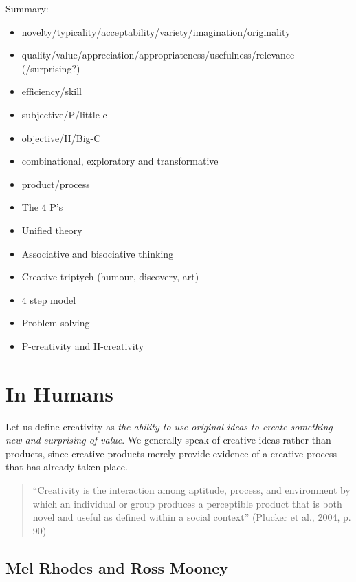 \begin{shaded}
  Summary:
  \begin{itemize}
    \item novelty/typicality/acceptability/variety/imagination/originality
    \item quality/value/appreciation/appropriateness/usefulness/relevance (/surprising?)
    \item efficiency/skill
    \item subjective/P/little-c
    \item objective/H/Big-C
    \item combinational, exploratory and transformative
    \item product/process
    \item The 4 P’s
    \item Unified theory
    \item Associative and bisociative thinking
    \item Creative triptych (humour, discovery, art)
    \item 4 step model
    \item Problem solving
    \item P-creativity and H-creativity
  \end{itemize}
\end{shaded}

\clearpage


\section{In Humans}


Let us define creativity as \emph{the ability to use original ideas to create something new and surprising of value}. We generally speak of creative ideas rather than products, since creative products merely provide evidence of a creative process that has already taken place.

\begin{quote}
  ``Creativity is the interaction among aptitude, process, and environment by which an individual or group produces a perceptible product that is both novel and useful as defined within a social context'' (Plucker et al., 2004, p. 90) \citep{Jordanous2012}
\end{quote}


\subsection{Mel Rhodes and Ross Mooney}

